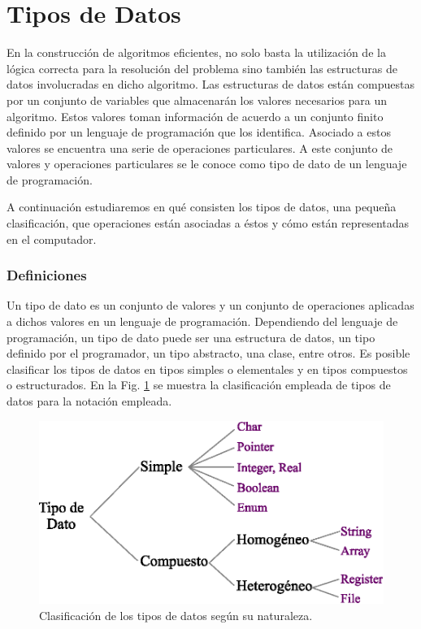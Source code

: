 \newpage
\part{Tipos de Datos}

En la construcción de algoritmos eficientes, no solo basta la utilización de la lógica correcta para la resolución del problema sino también las estructuras de datos involucradas en dicho algoritmo. Las estructuras de datos están compuestas por  un conjunto de variables que almacenarán los valores necesarios para un algoritmo. Estos valores toman información de acuerdo a un conjunto finito definido por un lenguaje de programación que los identifica. Asociado a estos valores se encuentra una serie de operaciones particulares. A este conjunto de valores y operaciones particulares se le conoce como tipo de dato de un lenguaje de programación.

A continuación estudiaremos en qué consisten los tipos de datos, una pequeña clasificación, que operaciones están asociadas a éstos y cómo están representadas en el computador. 

\section{Definiciones}

Un tipo de dato es un conjunto de valores y un conjunto de operaciones aplicadas a dichos valores en un lenguaje de programación. Dependiendo del lenguaje de programación, un tipo de dato puede ser una estructura de datos, un tipo definido por el programador, un tipo abstracto, una clase, entre otros. Es posible clasificar los tipos de datos en tipos simples o elementales y en tipos compuestos o estructurados. En la Fig. \ref{fig:tipodato} se muestra la clasificación empleada de tipos de datos para la notación  empleada.

\begin{figure}[!htb]
\centering
\includegraphics[scale=.7]{images/tipoDeDato.eps}
\caption{Clasificación de los tipos de datos según su naturaleza.}
\label{fig:tipodato}
\end{figure}

